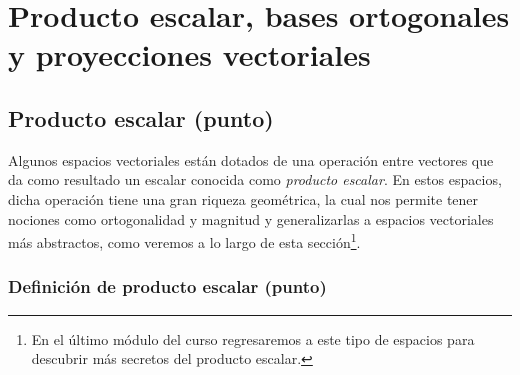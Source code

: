\documentclass[notasLineal]{subfile}
\begin{document}
\section{Producto escalar, bases ortogonales y proyecciones vectoriales}\label{Sec: Producto escalar, bases ortogonales y proyecciones vectoriales}

\subsection*{Producto escalar (punto)} \label{Ssec:Producto_escalar}

Algunos espacios vectoriales están dotados de una operación entre vectores que da como resultado un escalar conocida como \emph{producto escalar}. En estos espacios, dicha operación tiene una gran riqueza geométrica, la cual nos permite tener nociones como ortogonalidad y magnitud \textemdash y generalizarlas a espacios vectoriales más abstractos, como veremos a lo largo de esta sección\footnote{En el último módulo del curso regresaremos a este tipo de espacios para descubrir más secretos del producto escalar.}.

\subsubsection{Definición de producto escalar (punto)} \label{Def:Producto_escalar}
\end{document}
